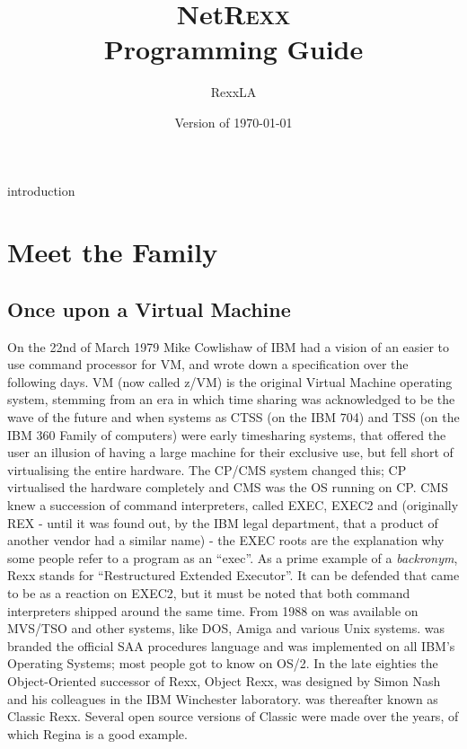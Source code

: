 
 
\renewcommand{\isbn}{978-90-819090-0-6}
\setcounter{tocdepth}{1}
\title{NetR\textsc{exx}\protect\\Programming Guide}
\author{RexxLA}
\date{\null\hfill Version  of \today}
\maketitle
{}
\pagestyle{fancy}
\frontmatter
{}


\tableofcontents
\newpage
{}
\frontmatter
\large

%
 {introduction}
\mainmatter
\chapter{Meet the \Rexx{} Family}
\section{Once upon a Virtual Machine}
On the 22nd of March 1979 Mike Cowlishaw of IBM had a
vision of an easier to use command processor for VM, and wrote down a
specification over the following days.
VM\textsuperscript{\texttrademark} (now called z/VM) is the original Virtual Machine operating system,  stemming from an
era in which time sharing was acknowledged to be the wave of the
future and when systems as CTSS (on the IBM 704) and TSS (on the IBM
360 Family of computers) were early timesharing systems, that offered
the user an illusion of having a large machine for their exclusive
use, but fell short of virtualising the entire hardware. The CP/CMS
system changed this; CP virtualised the hardware completely and CMS was the OS
running on CP. CMS knew a succession of command interpreters, called
EXEC, EXEC2 and \Rexx{}\textsuperscript{\texttrademark}  (originally REX
- until it was found out, by the IBM legal department, that a product of another vendor had a similar name) -
the EXEC roots are the explanation why some people refer to a \nr{}
program as an ``exec''. As a prime example of a \emph{backronym}, Rexx
stands for ``Restructured Extended Executor''. It
can be defended that \Rexx{} came to be as a reaction on EXEC2, but it
must be noted that both command interpreters shipped around the same
time. From 1988 on \Rexx{} was available on MVS/TSO and other systems,
like DOS, Amiga and various Unix systems. \Rexx{} was branded the
official SAA procedures language and was implemented on all IBM's
Operating Systems; most people got to know \Rexx{} on OS/2. In the late
eighties the Object-Oriented successor of Rexx, Object Rexx, was
designed by Simon Nash and his colleagues in the IBM Winchester
laboratory. \Rexx{} was thereafter known as Classic Rexx. Several open
source versions of Classic \Rexx{} were made over the years, of which
Regina is a good example.

